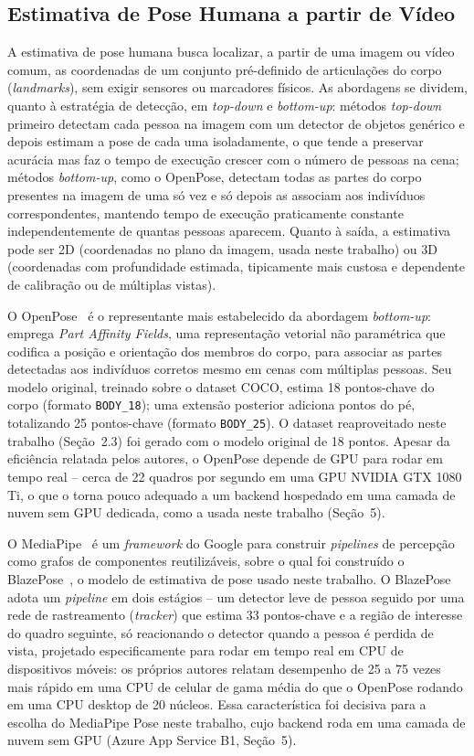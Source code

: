 \documentclass[12pt]{article}
\begin{document}
\subsection{Estimativa de Pose Humana a partir de Vídeo}

A estimativa de pose humana busca localizar, a partir de uma imagem ou
vídeo comum, as coordenadas de um conjunto pré-definido de articulações do
corpo (\textit{landmarks}), sem exigir sensores ou marcadores físicos. As
abordagens se dividem, quanto à estratégia de detecção, em \textit{top-down}
e \textit{bottom-up}: métodos \textit{top-down} primeiro detectam cada
pessoa na imagem com um detector de objetos genérico e depois estimam a pose
de cada uma isoladamente, o que tende a preservar acurácia mas faz o tempo
de execução crescer com o número de pessoas na cena; métodos
\textit{bottom-up}, como o OpenPose, detectam todas as partes do corpo
presentes na imagem de uma só vez e só depois as associam aos indivíduos
correspondentes, mantendo tempo de execução praticamente constante
independentemente de quantas pessoas aparecem. Quanto à saída, a estimativa
pode ser 2D (coordenadas no plano da imagem, usada neste trabalho) ou 3D
(coordenadas com profundidade estimada, tipicamente mais custosa e
dependente de calibração ou de múltiplas vistas).

O OpenPose~\cite{cao2021openpose} é o representante mais estabelecido da
abordagem \textit{bottom-up}: emprega \textit{Part Affinity Fields}, uma
representação vetorial não paramétrica que codifica a posição e orientação
dos membros do corpo, para associar as partes detectadas aos indivíduos
corretos mesmo em cenas com múltiplas pessoas. Seu modelo original, treinado
sobre o dataset COCO, estima 18 pontos-chave do corpo (formato
\texttt{BODY\_18}); uma extensão posterior adiciona pontos do pé,
totalizando 25 pontos-chave (formato \texttt{BODY\_25}). O dataset
reaproveitado neste trabalho (Seção~2.3) foi gerado com o modelo original de
18 pontos. Apesar da eficiência relatada pelos autores, o OpenPose depende
de GPU para rodar em tempo real -- cerca de 22 quadros por segundo em uma
GPU NVIDIA GTX 1080 Ti, o que o torna pouco adequado a um backend
hospedado em uma camada de nuvem sem GPU dedicada, como a usada neste
trabalho (Seção~5).

O MediaPipe~\cite{lugaresi2019mediapipe} é um \textit{framework} do Google
para construir \textit{pipelines} de percepção como grafos de componentes
reutilizáveis, sobre o qual foi construído o BlazePose~\cite{bazarevsky2020blazepose},
o modelo de estimativa de pose usado neste trabalho. O BlazePose adota um
\textit{pipeline} em dois estágios -- um detector leve de pessoa seguido por
uma rede de rastreamento (\textit{tracker}) que estima 33 pontos-chave e a
região de interesse do quadro seguinte, só reacionando o detector quando a
pessoa é perdida de vista, projetado especificamente para rodar em tempo
real em CPU de dispositivos móveis: os próprios autores relatam desempenho
de 25 a 75 vezes mais rápido em uma CPU de celular de gama média do que o
OpenPose rodando em uma CPU desktop de 20 núcleos. Essa característica foi
decisiva para a escolha do MediaPipe Pose neste trabalho, cujo backend roda
em uma camada de nuvem sem GPU (Azure App Service B1, Seção~5).
\end{document}
